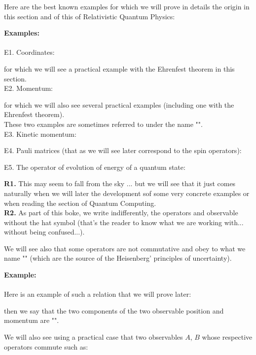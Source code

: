 	Here are the best known examples for which we will prove in details the origin in this section and of this of Relativistic Quantum Physics:
	\begin{tcolorbox}[colframe=black,colback=white,sharp corners]
	\textbf{{\Large {}}Examples:}\\\\	
	E1.	Coordinates:
	
	for which we will see a practical example with the Ehrenfest theorem in this section.\\
	
	E2. Momentum:
	
	for which we will also see several practical examples (including one with the Ehrenfest theorem).\\
	
	These two examples are sometimes referred to under the name "".\\
	
	E3. Kinetic momentum:
	

 	E4. Pauli matrices (that as we will see later correspond to the spin operators):
	

	E5. The operator of evolution of energy of a quantum state:
	
	\end{tcolorbox}
	\begin{tcolorbox}[title=Remarks,colframe=black,arc=10pt]
	\textbf{R1.} This may seem to fall from the sky ... but we will see that it just comes naturally when we will later the development sof some very concrete examples or when reading the section of Quantum Computing.\\
	
	\textbf{R2.} As part of this boke, we write indifferently, the operators and observable without the hat symbol (that's the reader to know what we are working with... without being confused...).
	\end{tcolorbox}
	We will see also that some operators are not commutative and obey to what we name "" (which are the source of the Heisenberg' principles of uncertainty).
	
	\begin{tcolorbox}[colframe=black,colback=white,sharp corners]
	\textbf{{\Large {}}Example:}\\\\	
	Here is an example of such a relation that we will prove later:
	
	then we say that the two components of the two observable position and momentum are "".
	\end{tcolorbox}
	We will also see using a practical case that two observables $A$, $B$ whose respective operators commute such as:
	
